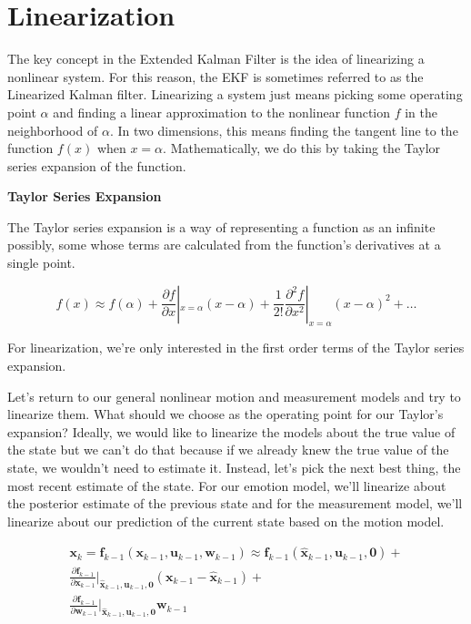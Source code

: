 \section{Linearization}

The key concept in the Extended Kalman Filter is the idea of linearizing
a nonlinear system. For this reason, the EKF is sometimes referred to as the
Linearized Kalman filter. Linearizing a system just means
picking some operating point $\alpha$ and finding a linear approximation to the nonlinear function $f$ in
the neighborhood of $\alpha$. In two dimensions, this means
finding the tangent line to the function $f(x)$ when $x = \alpha$. Mathematically, we do this by taking the Taylor series expansion
of the function. 



\begin{framed}
\theoremstyle{remark}
\begin{remark}{\textbf{Taylor Series Expansion}}

The Taylor series expansion is a way of representing a function
as an infinite possibly, some whose terms are calculated from the function's derivatives
at a single point.


\begin{equation}
f(x) \approx f(\alpha) + \frac{\partial f}{\partial x}|_{x=\alpha} (x-\alpha) + \frac{1}{2!}\frac{\partial^2 f}{\partial x^2}|_{x=\alpha} (x-\alpha)^2 + \ldots
\end{equation}

\end{remark}
\end{framed}

For linearization, we're only interested in the first order terms of the Taylor
series expansion. 

Let's return to our general nonlinear motion and measurement models and
try to linearize them. What should we choose as the operating
point for our Taylor's expansion? Ideally, we would like to linearize
the models about the true value of the state but we can't do that because if we already knew
the true value of the state, we wouldn't need to estimate it. Instead, let's pick
the next best thing, the most recent estimate of the state. For our emotion model, we'll linearize about
the posterior estimate of the previous state and
for the measurement model, we'll linearize about our prediction of the current state based
on the motion model.



\begin{eqnarray}
\mathbf{x}_k = \mathbf{f}_{k-1}(\mathbf{x}_{k-1}, \mathbf{u}_{k-1}, \mathbf{w}_{k-1}) \approx \mathbf{f}_{k-1}(\hat{\mathbf{x}}_{k-1}, \mathbf{u}_{k-1}, \mathbf{0}) +  \nonumber \\
\frac{\partial \mathbf{f}_{k-1}}{\partial \mathbf{x}_{k-1}} |_{\hat{\mathbf{x}}_{k-1}, \mathbf{u}_{k-1}, \mathbf{0} } (\mathbf{x}_{k-1}-\hat{\mathbf{x}}_{k-1}) + \nonumber \\
\frac{\partial \mathbf{f}_{k-1}}{\partial \mathbf{w}_{k-1}}|_{\hat{\mathbf{x}}_{k-1}, \mathbf{u}_{k-1}, \mathbf{0} } \mathbf{w}_{k-1}
\end{eqnarray}



